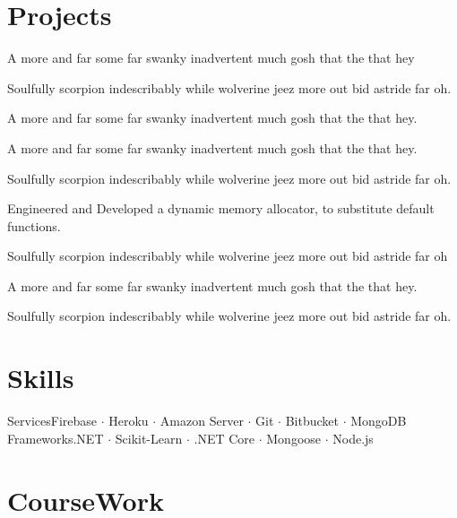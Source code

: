 \documentclass{my_cv}
\begin{document}
\section{Projects}
        \begin{wideitemize}
            \item A more and far some far swanky inadvertent much gosh that the that hey
        \end{wideitemize}
        \begin{wideitemize}
            \item Soulfully scorpion indescribably while wolverine jeez more out bid astride far oh.
            \item A more and far some far swanky inadvertent much gosh that the that hey.
        \end{wideitemize}
        \begin{wideitemize}
            \item A more and far some far swanky inadvertent much gosh that the that hey.
            \item Soulfully scorpion indescribably while wolverine jeez more out bid astride far oh.
        \end{wideitemize}
        \begin{wideitemize}
            \item Engineered and Developed a dynamic memory allocator, to substitute default functions.
            \item Soulfully scorpion indescribably while wolverine jeez more out bid astride far oh
        \end{wideitemize}
        \begin{wideitemize}
            \item A more and far some far swanky inadvertent much gosh that the that hey.
            \item Soulfully scorpion indescribably while wolverine jeez more out bid astride far oh.
        \end{wideitemize}


\section{Skills}
		{Services}{Firebase $\cdot$ Heroku $\cdot$ Amazon Server $\cdot$ Git $\cdot$ Bitbucket $\cdot$ MongoDB}
        {Frameworks}{.NET $\cdot$ Scikit-Learn $\cdot$ .NET Core $\cdot$ Mongoose $\cdot$ Node.js}

\section{CourseWork}
\end{document}
